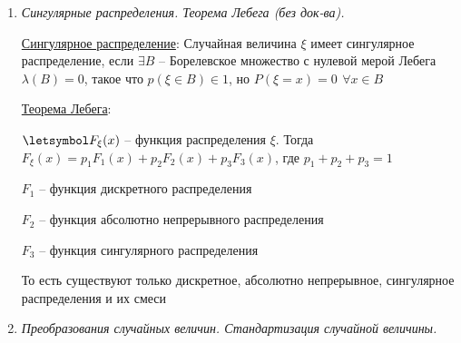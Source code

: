 \begin{enumerate}
\begin{enumerate}
        \item $\letsymbol \xi \in N(a, \sigma^2)$. Тогда $p(\alpha < \xi < \beta) = \Phi\left(\frac{\beta - a}{\sigma}\right) - \Phi\left(\frac{\alpha - a}{\sigma}\right)$

        \item Вероятность попадания в симметричный интервал (вероятность отклонения случайной величины от матожидания) 
        $p(|\xi - a| < t) = 2\Phi\left(\frac{t}{\sigma}\right)$

        \item Правило 3 \enquote{сигм}: $p(|\xi - a| < 3\sigma) \approx 0.9973$ -- попадание случайной величины нормального распределения в интервал $(a - 3\sigma, a + 3\sigma)$ близко к 1

        \item Свойство линейности: если случайная величина $\xi \in N(a, \sigma^2)$, то $\eta = \gamma \xi + b \in N(a \gamma + b, \gamma^2 \sigma^2)$ 

        \item Устойчивость относительно суммирования: если случайные величины $\xi_1 \in N(a_1, \sigma_1^2), \xi_2 \in N(a_2, \sigma_2^2)$, и они независимы, то $\xi_1 + \xi_2 \in N(a_1 + a_2, \sigma^2_1 + \sigma^2_2)$
    \end{enumerate}

    \item \textit{Сингулярные распределения. Теорема Лебега (без док-ва).}

    \hyperlink{singulardistribution}{Сингулярное распределение}: Случайная величина $\xi$ имеет сингулярное распределение, если $\exists B$ -- Борелевское множество с нулевой мерой Лебега $\lambda(B) = 0$, такое что $p(\xi \in B) \in 1$, но $P(\xi = x) = 0 \ \, \forall x \in B$

    \hyperlink{lebesguetheorem}{Теорема Лебега}: 

    $\letsymbol F_\xi(x)$ -- функция распределения $\xi$. Тогда $F_\xi(x) = p_1 F_1(x) + p_2 F_2(x) + p_3 F_3(x)$, где $p_1 + p_2 + p_3 = 1$

    $F_1$ -- функция дискретного распределения

    $F_2$ -- функция абсолютно непрерывного распределения

    $F_3$ -- функция сингулярного распределения

    То есть существуют только дискретное, абсолютно непрерывное, сингулярное распределения и их смеси

    \item \textit{Преобразования случайных величин. Стандартизация случайной величины. }


\end{enumerate}
